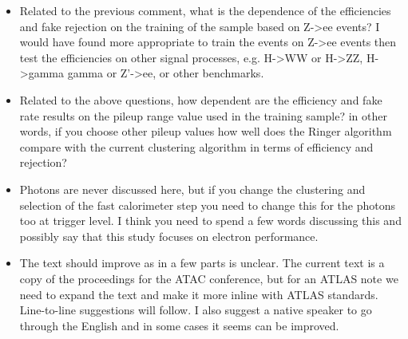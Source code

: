 \begin{itemize}
\item Related to the previous comment, what is the dependence of the efficiencies
and fake rejection on the training of the sample based on Z->ee events? I would
have found more appropriate to train the events on Z->ee events then test the
efficiencies on other signal processes, e.g. H->WW or H->ZZ, H->gamma gamma or
Z'->ee, or other benchmarks.

\item Related to the above questions, how dependent are the efficiency and fake rate
results on the pileup range value used in the training sample? in other words,
if you choose other pileup values how well does the Ringer algorithm compare
with the current clustering algorithm in terms of efficiency and rejection?

\item Photons  are never discussed here, but if you change the clustering and
selection of the fast calorimeter step you need to change this for the photons
too at trigger level. I think you need to spend a few words discussing this and
possibly say that this study focuses on electron performance.

\item The text should improve as in a few parts is unclear. The current text is a
copy of the proceedings for  the ATAC conference, but for an ATLAS note we need
to expand the text and make it more inline with ATLAS standards. Line-to-line
suggestions will follow. I also suggest a native speaker to go through the
English and in some cases it seems can be improved.
\end{itemize}

